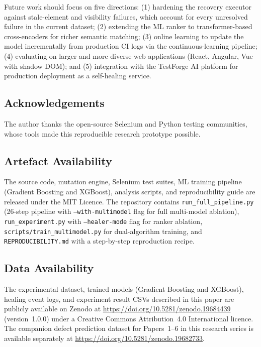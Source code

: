 \documentclass[12pt]{article}
\begin{document}
Future work should focus on five directions: (1) hardening the recovery executor against stale-element and visibility failures, which account for every unresolved failure in the current dataset; (2) extending the ML ranker to transformer-based cross-encoders for richer semantic matching; (3) online learning to update the model incrementally from production CI logs via the continuous-learning pipeline; (4) evaluating on larger and more diverse web applications (React, Angular, Vue with shadow DOM); and (5) integration with the TestForge AI platform for production deployment as a self-healing service.

\subsection*{Acknowledgements}

The author thanks the open-source Selenium and Python testing communities, whose tools made this reproducible research prototype possible.

\subsection*{Artefact Availability}

The source code, mutation engine, Selenium test suites, ML training pipeline (Gradient Boosting and XGBoost), analysis scripts, and reproducibility guide are released under the MIT Licence. The repository contains \texttt{run\_full\_pipeline.py} (26-step pipeline with \texttt{--with-multimodel} flag for full multi-model ablation), \texttt{run\_experiment.py} with \texttt{--healer-mode} flag for ranker ablation, \texttt{scripts/train\_multimodel.py} for dual-algorithm training, and \texttt{REPRODUCIBILITY.md} with a step-by-step reproduction recipe.

\subsection*{Data Availability}

The experimental dataset, trained models (Gradient Boosting and XGBoost), healing event logs, and experiment result CSVs described in this paper are publicly available on Zenodo at \url{https://doi.org/10.5281/zenodo.19684439} (version~1.0.0) under a Creative Commons Attribution~4.0 International licence. The companion defect prediction dataset for Papers~1--6 in this research series is available separately at \url{https://doi.org/10.5281/zenodo.19682733}.
\end{document}
